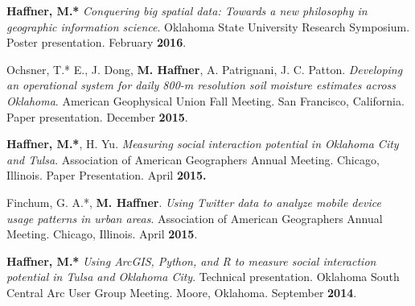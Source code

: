 \begin{cventries}
   \cventry
      {}
      {}
      {}
      {}
      {
        \begin{cvitems}
          \vspace{-2mm}
            \item {\textbf{Haffner, M.*} \textit{Conquering big spatial data: Towards a new philosophy in geographic information science}. Oklahoma State University Research Symposium. Poster presentation. February \textbf{2016}.}   
              \end{cvitems}
            }

   \cventry
      {}
      {}
      {}
      {}
      {
        \begin{cvitems}
          \vspace{-2mm}
            \item {Ochsner, T.* E., J. Dong, \textbf{M. Haffner}, A. Patrignani, J. C. Patton. \textit{Developing an operational system for daily 800-m resolution soil moisture estimates across Oklahoma}. American Geophysical Union Fall Meeting. San Francisco, California. Paper presentation. December \textbf{2015}.} 
            \end{cvitems}
            }

   \cventry
      {}
      {}
      {}
      {}
      {
        \begin{cvitems}
          \vspace{-2mm}
            \item {\textbf{Haffner, M.*}, H. Yu. \textit{Measuring social interaction potential in Oklahoma City and Tulsa}. Association of American Geographers Annual Meeting. Chicago, Illinois. Paper Presentation. April \textbf{2015.}} 
              \end{cvitems}
              }

   \cventry
      {}
      {}
      {}
      {}
      {
        \begin{cvitems}
          \vspace{-2mm}
            \item {Finchum, G. A.*, \textbf{M. Haffner}. \textit{Using Twitter data to analyze mobile device usage patterns in urban areas}. Association of American Geographers Annual Meeting. Chicago, Illinois. April \textbf{2015}.}  
              \end{cvitems}
            }

   \cventry
      {}
      {}
      {}
      {}
      {
        \begin{cvitems}
          \vspace{-2mm}
            \item {\textbf{Haffner, M.*} \textit{Using ArcGIS, Python, and R to measure social interaction potential in Tulsa and Oklahoma City}. Technical presentation. Oklahoma South Central Arc User Group Meeting. Moore, Oklahoma. September \textbf{2014}.} 
            \end{cvitems}
            }


\end{cventries}

